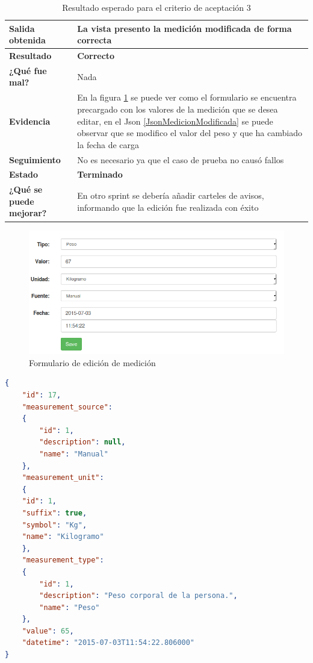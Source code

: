             {\scriptsize
	\begin{table}[h]
	\centering
	\begin{tabular}{|l|p{10cm}|}
	    \hline 
	    \textbf{Salida obtenida}& La vista presento la medición modificada de forma correcta\\ \hline
	    \textbf{Resultado}& \textbf{Correcto}\\ \hline
        \textbf{¿Qué fue mal?}& Nada\\ \hline      
        \textbf{Evidencia}&  En la figura \ref{edicion_medicion} se puede ver como el formulario se encuentra precargado con los valores de la medición que se desea editar, en el Json \ref{JsonMedicionModificada} se puede observar que se modifico el valor del peso y que ha cambiado la fecha de carga \\ \hline
        \textbf{Seguimiento}& No es necesario ya que el caso de prueba no causó
fallos\\ \hline
        \textbf{Estado}& \textbf{Terminado}\\ \hline        
        \textbf{¿Qué se puede mejorar?}& En otro sprint se debería añadir carteles de avisos, informando que la edición fue realizada con éxito \\ \hline              
	    \end{tabular}
        \caption{Resultado esperado para el criterio de aceptación 3}
    	\end{table}
	}
\begin{figure}[h]
        \centering
        \includegraphics[width=1\textwidth]{img/2-prueba_3}
        \caption{Formulario de edición de medición}
		\label{edicion_medicion}
\end{figure}

\begin{lstlisting}[language=json,firstnumber=1,  breaklines=true, caption= Json de las medicion modificada del perfil id:3, label=JsonMedicionModificada]
{
	"id": 17,
    "measurement_source": 
	{
    	"id": 1,
	    "description": null,
	    "name": "Manual"
	},
	"measurement_unit": 
	{
    "id": 1,
    "suffix": true,
    "symbol": "Kg",
    "name": "Kilogramo"
	},
	"measurement_type": 
    {
        "id": 1,
        "description": "Peso corporal de la persona.",
        "name": "Peso"
    },
    "value": 65,
    "datetime": "2015-07-03T11:54:22.806000"
}
\end{lstlisting}
\clearpage  

